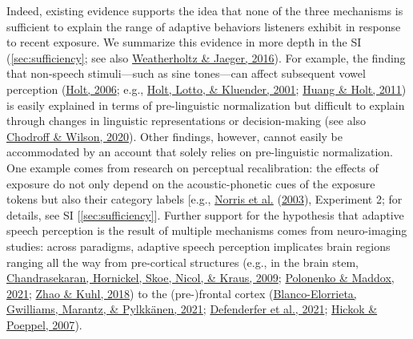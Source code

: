 \documentclass[
  11pt,
  english,
  man,floatsintext]{apa6}
\begin{document}
Indeed, existing evidence supports the idea that none of the three mechanisms is sufficient to explain the range of adaptive behaviors listeners exhibit in response to recent exposure. We summarize this evidence in more depth in the SI (\ref{sec:sufficiency}; see also \protect\hyperlink{ref-weatherholtz-jaeger2016}{Weatherholtz \& Jaeger, 2016}). For example, the finding that non-speech stimuli---such as sine tones---can affect subsequent vowel perception (\protect\hyperlink{ref-holt2006}{Holt, 2006}; e.g., \protect\hyperlink{ref-holt2001}{Holt, Lotto, \& Kluender, 2001}; \protect\hyperlink{ref-huang-holt2011}{Huang \& Holt, 2011}) is easily explained in terms of pre-linguistic normalization but difficult to explain through changes in linguistic representations or decision-making (see also \protect\hyperlink{ref-chodroff-wilson2020}{Chodroff \& Wilson, 2020}). Other findings, however, cannot easily be accommodated by an account that solely relies on pre-linguistic normalization. One example comes from research on perceptual recalibration: the effects of exposure do not only depend on the acoustic-phonetic cues of the exposure tokens but also their category labels {[}e.g., \protect\hyperlink{ref-norris2003}{Norris et al.} (\protect\hyperlink{ref-norris2003}{2003}), Experiment 2; for details, see SI {[}\ref{sec:sufficiency}{]}. Further support for the hypothesis that adaptive speech perception is the result of multiple mechanisms comes from neuro-imaging studies: across paradigms, adaptive speech perception implicates brain regions ranging all the way from pre-cortical structures (e.g., in the brain stem, \protect\hyperlink{ref-chandrasekaran2009}{Chandrasekaran, Hornickel, Skoe, Nicol, \& Kraus, 2009}; \protect\hyperlink{ref-polonenko2021}{Polonenko \& Maddox, 2021}; \protect\hyperlink{ref-zhao2018}{Zhao \& Kuhl, 2018}) to the (pre-)frontal cortex (\protect\hyperlink{ref-blanco-elorriera2021}{Blanco-Elorrieta, Gwilliams, Marantz, \& Pylkkänen, 2021}; \protect\hyperlink{ref-defenderfer2021}{Defenderfer et al., 2021}; \protect\hyperlink{ref-hickok-poeppel2007}{Hickok \& Poeppel, 2007}).
\end{document}
